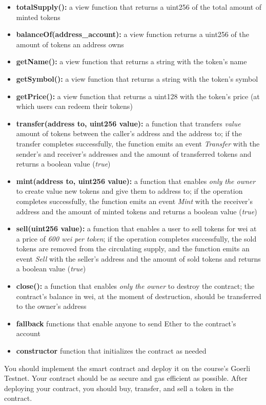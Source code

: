 \documentclass[12pt,addpoints,answers]{exam}
\begin{document}
\begin{questions}
\begin{itemize}
\item \textbf{totalSupply():} a view function that returns a uint256 of the total amount of minted tokens
\item \textbf{balanceOf(address\_account):} a view function returns a uint256 of the amount of tokens
an address owns
\item \textbf{getName():} a view function that returns a string with the token’s name
\item \textbf{getSymbol():} a view function that returns a string with the token’s symbol
\item \textbf{getPrice():} a view function that returns a uint128 with the token’s price (at which users can
redeem their tokens)

\item \textbf{transfer(address to, uint256 value):} a function that transfers \emph{value} amount of tokens
between the caller’s address and the address to; if the transfer completes successfully, the
function emits an event \emph{Transfer} with the sender’s and receiver’s addresses and the amount
of transferred tokens and returns a boolean value (\emph{true})
\item \textbf{mint(address to, uint256 value):} a function that enables \emph{only the owner} to create value new tokens and give them to address to; if the operation completes successfully, the
function emits an event \emph{Mint} with the receiver’s address and the amount of minted tokens
and returns a boolean value (\emph{true})
\item \textbf{sell(uint256 value):} a function that enables a user to sell tokens for wei at a price of \emph{600 wei per token}; if the operation completes successfully, the sold tokens are removed from
the circulating supply, and the function emits an event \emph{Sell} with the seller’s address and the
amount of sold tokens and returns a boolean value (\emph{true})
\item \textbf{close():} a function that enables \emph{only the owner} to destroy the contract; the contract’s
balance in wei, at the moment of destruction, should be transferred to the owner's address
\item \textbf{fallback} functions that enable anyone to send Ether to the contract’s account
\item \textbf{constructor} function that initializes the contract as needed

\end{itemize}

You should implement the smart contract and deploy it on the course's Goerli Testnet. Your contract should be as secure and gas efficient as possible. After deploying your contract, you should buy, transfer, and sell a token in the contract.


\end{questions}
\end{document}
